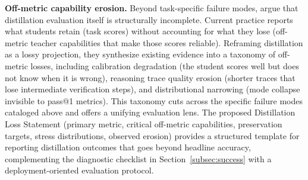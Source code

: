 \documentclass{article} %
\begin{document}
\textbf{Off-metric capability erosion.} Beyond task-specific failure modes, \citet{2604.25110} argue that distillation evaluation itself is structurally incomplete. Current practice reports what students retain (task scores) without accounting for what they lose (off-metric teacher capabilities that make those scores reliable). Reframing distillation as a lossy projection, they synthesize existing evidence into a taxonomy of off-metric losses, including calibration degradation (the student scores well but does not know when it is wrong), reasoning trace quality erosion (shorter traces that lose intermediate verification steps), and distributional narrowing (mode collapse invisible to pass@1 metrics). This taxonomy cuts across the specific failure modes cataloged above and offers a unifying evaluation lens. The proposed Distillation Loss Statement (primary metric, critical off-metric capabilities, preservation targets, stress distributions, observed erosion) provides a structured template for reporting distillation outcomes that goes beyond headline accuracy, complementing the diagnostic checklist in Section~\ref{subsec:success} with a deployment-oriented evaluation protocol.
\end{document}
